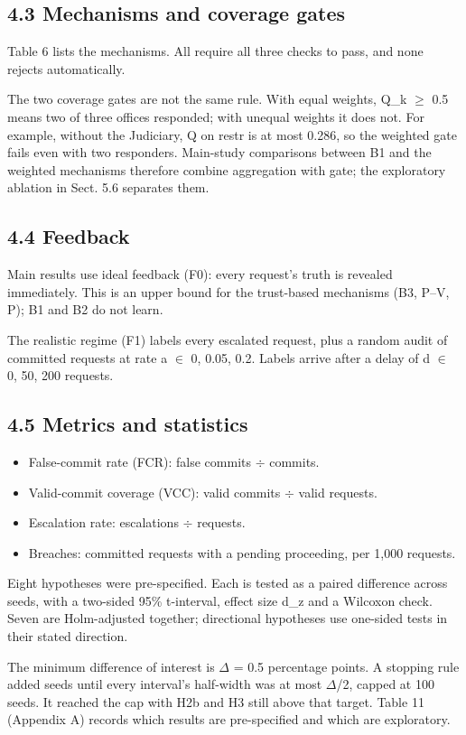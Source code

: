 \documentclass[10pt]{article}
\begin{document}

\subsection*{4.3 Mechanisms and coverage gates}
Table 6 lists the mechanisms. All require all three checks to pass, and none rejects automatically.


The two coverage gates are not the same rule. With equal weights, Q\_k $\geq$ 0.5 means two of three offices responded; with unequal weights it does not. For example, without the Judiciary, Q on restr is at most 0.286, so the weighted gate fails even with two responders. Main-study comparisons between B1 and the weighted mechanisms therefore combine aggregation with gate; the exploratory ablation in Sect. 5.6 separates them.

\subsection*{4.4 Feedback}
Main results use ideal feedback (F0): every request's truth is revealed immediately. This is an upper bound for the trust-based mechanisms (B3, P--V, P); B1 and B2 do not learn.

The realistic regime (F1) labels every escalated request, plus a random audit of committed requests at rate a $\in$ {0, 0.05, 0.2}. Labels arrive after a delay of d $\in$ {0, 50, 200} requests.

\subsection*{4.5 Metrics and statistics}
\begin{itemize}
\item False-commit rate (FCR): false commits $\div$ commits.
\item Valid-commit coverage (VCC): valid commits $\div$ valid requests.
\item Escalation rate: escalations $\div$ requests.
\item Breaches: committed requests with a pending proceeding, per 1,000 requests.
\end{itemize}
Eight hypotheses were pre-specified. Each is tested as a paired difference across seeds, with a two-sided 95\% t-interval, effect size d\_z and a Wilcoxon check. Seven are Holm-adjusted together; directional hypotheses use one-sided tests in their stated direction.

The minimum difference of interest is $\Delta$ = 0.5 percentage points. A stopping rule added seeds until every interval's half-width was at most $\Delta$/2, capped at 100 seeds. It reached the cap with H2b and H3 still above that target. Table 11 (Appendix A) records which results are pre-specified and which are exploratory.
\end{document}
